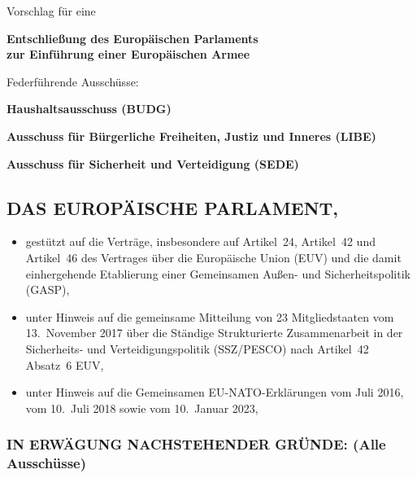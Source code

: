 \documentclass[12pt,a4paper]{article}
\title{}
\author{}
\date{}
\begin{document}
\thispagestyle{empty}

\vspace*{2cm}

\begin{center}
\Large
Vorschlag für eine

\vspace{0.8cm}

\textbf{\large Entschließung des Europäischen Parlaments\\[0.3em]
zur Einführung einer Europäischen Armee}

\vspace{2cm}

\normalsize
Federführende Ausschüsse:

\vspace{0.5cm}

\textbf{Haushaltsausschuss (BUDG)}

\textbf{Ausschuss für Bürgerliche Freiheiten, Justiz und Inneres (LIBE)}

\textbf{Ausschuss für Sicherheit und Verteidigung (SEDE)}
\end{center}

\PlaceLogosOne


\newpage

\subsection*{DAS EUROPÄISCHE PARLAMENT,}

\begin{itemize}[leftmargin=2em, itemsep=8pt]
    \item gestützt auf die Verträge, insbesondere auf Artikel~24, Artikel~42 und Artikel~46 des
    Vertrages über die Europäische Union (EUV) und die damit einhergehende Etablierung
    einer Gemeinsamen Außen- und Sicherheitspolitik (GASP),

    \item unter Hinweis auf die gemeinsame Mitteilung von 23 Mitgliedstaaten vom
    13.~November 2017 über die Ständige Strukturierte Zusammenarbeit in der Sicherheits-
    und Verteidigungspolitik (SSZ/PESCO) nach Artikel~42 Absatz~6 EUV,

    \item unter Hinweis auf die Gemeinsamen EU-NATO-Erklärungen vom Juli 2016, vom
    10.~Juli 2018 sowie vom 10.~Januar 2023,
\end{itemize}

\subsubsection*{IN ERWÄGUNG NACHSTEHENDER GRÜNDE: (Alle Ausschüsse)}
\end{document}
